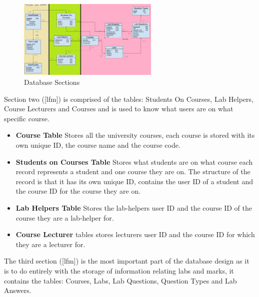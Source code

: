 \documentclass[12pt]{article}  %
\begin{document}
\begin{figure}[H]
    \centering
    \includegraphics[width=0.6\textwidth]{images/design/DB_Sections.png}
    \caption{Database Sections}
    \label{fig:dbsections}
\end{figure}


\noindent Section two ([lfm]) is comprised of the tables: Students On Courses, Lab Helpers, Course Lecturers and Courses and is used to know what users are on what specific course.
\begin{itemize}
    \item \textbf{Course Table} Stores all the university courses, each course is stored with its own unique ID, the course name and the course code.
    \item \textbf{Students on Courses Table} Stores what students are on what course each record represents a student and one course they are on. The structure of the record is that it has its own unique ID, contains the user ID of a student and the course ID for the course they are on. 
    \item \textbf{Lab Helpers Table} Stores the lab-helpers user ID and the course ID of the course they are a lab-helper for.
    \item \textbf{Course Lecturer} tables stores lecturers user ID and the course ID for which they are a lecturer for.
\end{itemize}



The third section ([lfm]) is the most important part of the database design as it is to do entirely with the storage of information relating labs and marks, it contains the tables: Courses, Labs, Lab Questions, Question Types and Lab Answers.
\end{document}
